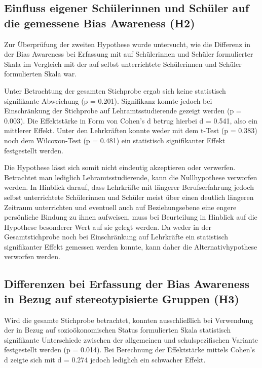 \subsection{Einfluss eigener Schülerinnen und Schüler auf die gemessene Bias Awareness (H2)}
\label{subsec:diskussion-h2}

Zur Überprüfung der zweiten Hypothese wurde untersucht, wie die Differenz in der Bias Awareness bei Erfassung mit auf Schülerinnen und Schüler formulierter Skala im Vergleich mit der auf selbst unterrichtete Schülerinnen und Schüler formulierten Skala war.

Unter Betrachtung der gesamten Stichprobe ergab sich keine statistisch signifikante Abweichung (p = 0.201).
Signifikanz konnte jedoch bei Einschränkung der Stichprobe auf Lehramtsstudierende gezeigt werden (p = 0.003).
Die Effektstärke in Form von Cohen's d betrug hierbei d = 0.541, also ein mittlerer Effekt.
Unter den Lehrkräften konnte weder mit dem t-Test (p = 0.383) noch dem Wilcoxon-Test (p = 0.481) ein statistisch signifikanter Effekt festgestellt werden.

Die Hypothese lässt sich somit nicht eindeutig akzeptieren oder verwerfen.
Betrachtet man lediglich Lehramtsstudierende, kann die Nullhypothese verworfen werden.
In Hinblick darauf, dass Lehrkräfte mit längerer Berufserfahrung jedoch selbst unterrichtete Schülerinnen und Schüler meist über einen deutlich längeren Zeitraum unterrichten und eventuell auch auf Beziehungsebene eine engere persönliche Bindung zu ihnen aufweisen, muss bei Beurteilung in Hinblick auf die Hypothese besonderer Wert auf sie gelegt werden.
Da weder in der Gesamtstichprobe noch bei Einschränkung auf Lehrkräfte ein statistisch signifikanter Effekt gemessen werden konnte, kann daher die Alternativhypothese verworfen werden.

\subsection{Differenzen bei Erfassung der Bias Awareness in Bezug auf stereotypisierte Gruppen (H3)}
\label{subsec:diskussion-h3}

Wird die gesamte Stichprobe betrachtet, konnten ausschließlich bei Verwendung der in Bezug auf sozioökonomischen Status formulierten Skala statistisch signifikante Unterschiede zwischen der allgemeinen und schulspezifischen Variante festgestellt werden (p = 0.014).
Bei Berechnung der Effektstärke mittels Cohen's d zeigte sich mit d = 0.274 jedoch lediglich ein schwacher Effekt.

